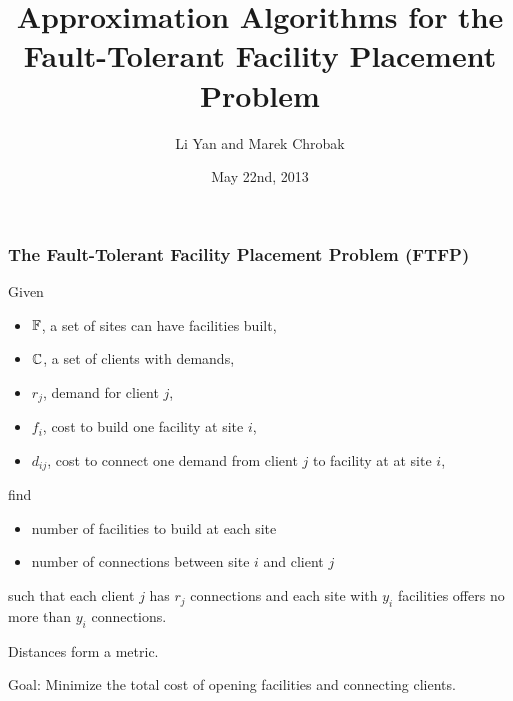 \documentclass[handout, hyperref, xcolor=dvipsnames]{beamer}
\title{Approximation Algorithms
  for the Fault-Tolerant Facility Placement Problem}
\author[lyan,marek]{Li Yan and Marek Chrobak}
\institute[UCR]{
  Computer Science\\
  University of California Riverside\\
}
\date{May 22nd, 2013}
\begin{document}
\begin{frame}
  \titlepage
\end{frame}

\begin{frame}
  \frametitle{The Fault-Tolerant Facility Placement Problem (FTFP)}
  Given
  \begin{itemize}
  \item $\mathbb{F}$, a set of sites can have facilities built,
  \item $\mathbb{C}$, a set of clients with demands,
  \item $r_j$, demand for client $j$,
  \item $f_i$, cost to build one facility at site $i$,
  \item $d_{ij}$, cost to connect one demand from client $j$ to facility at at site $i$,
  \end{itemize}
  find 
  \begin{itemize}
  \item number of facilities to build at each site
  \item number of connections between site $i$ and client $j$
  \end{itemize}
  such that each client $j$ has $r_j$ connections and each site with
  $y_i$ facilities offers no more than $y_i$ connections.

  Distances form a metric.

  Goal:
  Minimize the total cost of opening facilities and connecting clients.
\end{frame}
\end{document}
